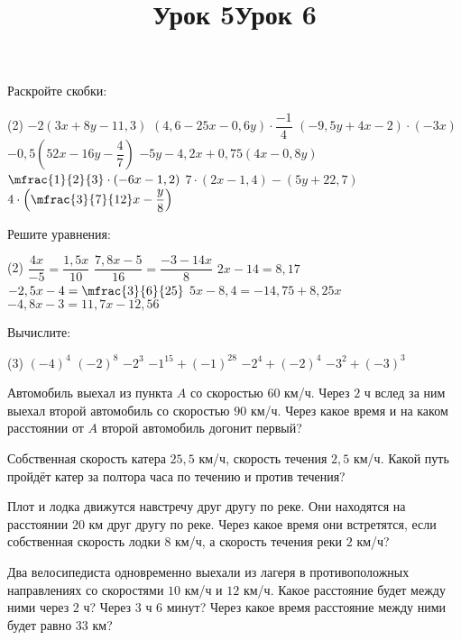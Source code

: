 \begin{class}[number=5]
	\title{Урок 5}
	\begin{listofex}
		\item Раскройте скобки:
		\begin{tasks}(2)
			\task \( -2(3x+8y-11,3) \)
			\task \( (4,6-25x-0,6y) \cdot \dfrac{ -1 }{ 4 } \)
			\task \( (-9,5y+4x-2) \cdot (-3x) \)
			\task \( -0,5(52x-16y-\dfrac{ 4 }{ 7 }) \)
			\task \( -5y-4,2x+0,75(4x-0,8y) \)
			\task \( \mfrac{1 }{ 2}{3 } \cdot \left( -6x - 1,2 \right) \)
			\task \( 7 \cdot (2x-1,4) - (5y+22,7) \)
			\task \( 4 \cdot \left( \mfrac{3 }{7 }{12 }x - \dfrac{ y }{ 8 } \right) \)
		\end{tasks}
		\item Решите уравнения:
		\begin{tasks}(2)
			\task \( \dfrac{ 4x }{ -5 }=\dfrac{ 1,5x }{ 10 } \)
			\task \( \dfrac{ 7,8x-5 }{ 16 }=\dfrac{ -3-14x }{ 8 } \)
			\task \( 2x-14=8,17 \)
			\task \( -2,5x-4=\mfrac{3 }{6 }{25 } \)
			\task \( 5x-8,4=-14,75+8,25x \)
			\task \( -4,8x-3=11,7x-12,56 \)
		\end{tasks}
		\item Вычислите:
		\begin{tasks}(3)
			\task \( (-4)^{4} \)
			\task \( (-2)^{8} \)
			\task \( -2^3 \)
			\task \( -1^{15}+(-1)^{28} \)
			\task \( -2^{4}+(-2)^{4} \)
			\task \( -3^{2}+(-3)^{3} \)
		\end{tasks}
	\end{listofex}
	\newpage
	\title{Урок 6}
		\begin{listofex}
			\item Автомобиль выехал из пункта \(A\) со скоростью \(60\) км/ч. Через \(2\) ч вслед за ним выехал второй автомобиль со скоростью \(90\) км/ч. Через какое время и на каком расстоянии от \(A\) второй автомобиль догонит первый?
			\item Собственная скорость катера \(25,5\) км/ч, скорость течения \(2,5\) км/ч. Какой путь пройдёт катер за полтора часа по течению и против течения?
			\item Плот и лодка движутся навстречу друг другу по реке. Они находятся на расстоянии \(20\) км друг другу по реке. Через какое время они встретятся, если собственная скорость лодки \(8\) км/ч, а скорость течения реки \(2\) км/ч?
			\item Два велосипедиста одновременно выехали из лагеря в противоположных направлениях со скоростями \(10\) км/ч и \(12\) км/ч. Какое расстояние будет между ними через \(2\) ч? Через \(3\) ч \(6\) минут? Через какое время расстояние между ними будет равно \(33\) км?
	\end{listofex}
\end{class}

